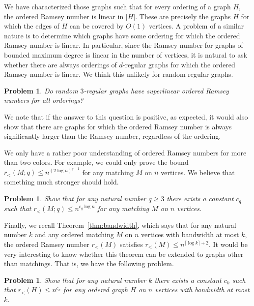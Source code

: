 \documentclass[11pt]{article}
\newtheorem{problem}[theorem]{Problem}
\begin{document}
We have characterized those graphs such that for every ordering of a graph $H$, the ordered Ramsey number is linear in $|H|$. These are precisely the graphs $H$ for which the edges of $H$ can be covered by $O(1)$ vertices. A problem of a similar nature is to determine which graphs have some ordering for which the ordered Ramsey number is linear. In particular, since the Ramsey number for graphs of bounded maximum degree is linear in the number of vertices, it is natural to ask whether there are always orderings of $d$-regular graphs for which the ordered Ramsey number is linear. We think this unlikely for random regular graphs.

\begin{problem}
Do random $3$-regular graphs have superlinear ordered Ramsey numbers for all orderings?
\end{problem}
We note that if the answer to this question is positive, as expected, it would also show that there are graphs for which the ordered Ramsey number is always significantly larger than the Ramsey number, regardless of the ordering.

We only have a rather poor understanding of ordered Ramsey numbers for more than two colors. For example, we could only prove the bound $r_<(M; q) \leq n^{(2 \log n)^{q-1}}$ for any matching $M$ on $n$ vertices. We believe that something much stronger should hold.

\begin{problem}
Show that for any natural number $q \geq 3$ there exists a constant $c_q$ such that $r_<(M;q) \leq n^{c_q \log n}$ for any matching $M$ on $n$ vertices.
\end{problem}

Finally, we recall Theorem~\ref{thm:bandwidth}, which says that for any natural number $k$ and any ordered matching $M$ on $n$ vertices with bandwidth at most $k$, the ordered Ramsey number $r_<(M)$ satisfies $r_<(M) \leq n^{\lceil \log k \rceil + 2}$. It would be very interesting to know whether this theorem can be extended to graphs other than matchings. That is, we have the following problem.

\begin{problem} \label{prob:bdw}
Show that for any natural number $k$ there exists a constant $c_k$ such that $r_<(H) \leq n^{c_k}$ for any ordered graph $H$ on $n$ vertices with bandwidth at most $k$.
\end{problem}
\end{document}
